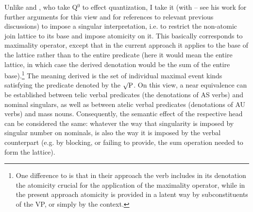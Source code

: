 \documentclass[output=paper]{langscibook}
\begin{document}
Unlike \citet{Borer.2005} and \citet{Lazor.2010}, who take Q$^0$ to effect quantization, I take it (with \citealt{Milosav.dis} -- see his work for further arguments for this view and for references to relevant previous discussions) to impose a singular interpretation, i.e. to restrict the non-atomic join lattice to its base and impose atomicity on it. This basically corresponds to  maximality operator, except that in the current approach it applies to the base of the lattice rather than to the entire predicate (here it would mean the entire lattice, in which case the derived denotation would be the sum of the entire base).\footnote{One difference to \citet{FilipRothstein.2005} is that in their approach the verb includes in its denotation the atomicity crucial for the application of the maximality operator, while in the present approach atomicity is provided in a latent way by subconstituents of the VP, or simply by the context.} The meaning derived is the set of individual maximal event kinds satisfying the predicate denoted by the $\surd\text{P}$. On this view, a near equivalence can be established between telic verbal predicates (the denotations of AS verbs) and nominal singulars, as well as between atelic verbal predicates (denotations of AU verbs) and mass nouns. Consequently, the semantic effect of the respective head can be considered the same: whatever the way that singularity is imposed by singular number on nominals, is also the way it is imposed by the verbal counterpart (e.g. by blocking, or failing to provide, the sum operation needed to form the lattice).
\end{document}
